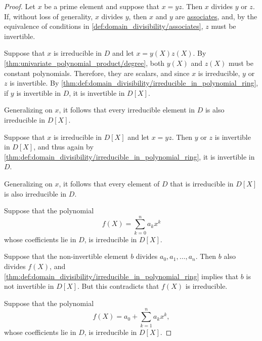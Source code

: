 \begin{proof}
   Let \( x \) be a prime element and suppose that \( x = yz \). Then \( x \) divides \( y \) or \( z \). If, without loss of generality, \( x \) divides \( y \), then \( x \) and \( y \) are \hyperref[def:domain_divisibility/associates]{associates}, and, by the equivalence of conditions in \cref{def:domain_divisibility/associates}, \( z \) must be invertible.


  \SufficiencySubProof* Suppose that \( x \) is irreducible in \( D \) and let \( x = y(X) z(X) \). By \cref{thm:univariate_polynomial_product/degree}, both \( y(X) \) and \( z(X) \) must be constant polynomials. Therefore, they are scalars, and since \( x \) is irreducible, \( y \) or \( z \) is invertible. By \cref{thm:def:domain_divisibility/irreducible_in_polynomial_ring}, if \( y \) is invertible in \( D \), it is invertible in \( D[X] \).

  Generalizing on \( x \), it follows that every irreducible element in \( D \) is also irreducible in \( D[X] \).

  \NecessitySubProof* Suppose that \( x \) is irreducible in \( D[X] \) and let \( x = yz \). Then \( y \) or \( z \) is invertible in \( D[X] \), and thus again by \cref{thm:def:domain_divisibility/irreducible_in_polynomial_ring}, it is invertible in \( D \).

  Generalizing on \( x \), it follows that every element of \( D \) that is irreducible in \( D[X] \) is also irreducible in \( D \).

   Suppose that the polynomial
  \begin{equation*}
    f(X) = \sum_{k=0}^n a_k x^k
  \end{equation*}
  whose coefficients lie in \( D \), is irreducible in \( D[X] \).

  Suppose that the non-invertible element \( b \) divides \( a_0, a_1, \ldots, a_n \). Then \( b \) also divides \( f(X) \), and \cref{thm:def:domain_divisibility/irreducible_in_polynomial_ring} implies that \( b \) is not invertible in \( D[X] \). But this contradicts that \( f(X) \) is irreducible.

   Suppose that the polynomial
  \begin{equation*}
    f(X) = a_0 + \sum_{k=1}^n a_k x^k,
  \end{equation*}
  whose coefficients lie in \( D \), is irreducible in \( D[X] \).


\end{proof}
